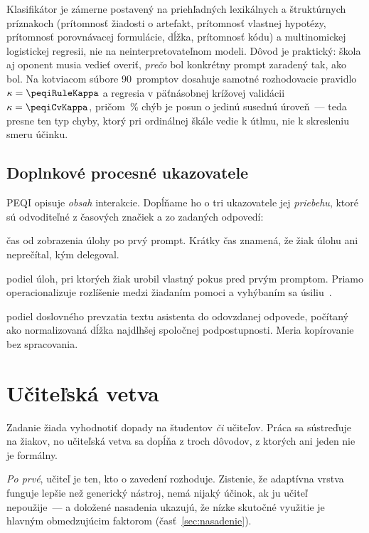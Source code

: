 Klasifikátor je zámerne postavený na priehľadných lexikálnych a štruktúrnych príznakoch (prítomnosť žiadosti o artefakt, prítomnosť vlastnej hypotézy, prítomnosť porovnávacej formulácie, dĺžka, prítomnosť kódu) a multinomickej logistickej regresii, nie na neinterpretovateľnom modeli. Dôvod je praktický: škola aj oponent musia vedieť overiť, \emph{prečo} bol konkrétny prompt zaradený tak, ako bol. Na kotviacom súbore 90~promptov dosahuje samotné rozhodovacie pravidlo $\kappa=\peqiRuleKappa$ a regresia v päťnásobnej krížovej validácii $\kappa=\peqiCvKappa$, pričom \peqiAdjacent\,\% chýb je posun o jedinú susednú úroveň~--- teda presne ten typ chyby, ktorý pri ordinálnej škále vedie k útlmu, nie k skresleniu smeru účinku.

\subsection{Doplnkové procesné ukazovatele}

PEQI opisuje \emph{obsah} interakcie. Dopĺňame ho o tri ukazovatele jej \emph{priebehu}, ktoré sú odvoditeľné z časových značiek a zo zadaných odpovedí:

\begin{description}[leftmargin=1.9cm, style=nextline, nosep]
    \item[$T_1$] čas od zobrazenia úlohy po prvý prompt. Krátky čas znamená, že žiak úlohu ani neprečítal, kým delegoval.
    \item[ABHR] podiel úloh, pri ktorých žiak urobil vlastný pokus pred prvým promptom. Priamo operacionalizuje rozlíšenie medzi žiadaním pomoci a vyhýbaním sa úsiliu~\cite{aleven2003help,baker2004gaming}.
    \item[VTR] podiel doslovného prevzatia textu asistenta do odovzdanej odpovede, počítaný ako normalizovaná dĺžka najdlhšej spoločnej podpostupnosti. Meria kopírovanie bez spracovania.
\end{description}

\section{Učiteľská vetva}
\label{sec:ucitelia}

Zadanie žiada vyhodnotiť dopady na študentov \emph{či} učiteľov. Práca sa sústreďuje na žiakov, no učiteľská vetva sa dopĺňa z troch dôvodov, z ktorých ani jeden nie je formálny.

\emph{Po prvé}, učiteľ je ten, kto o zavedení rozhoduje. Zistenie, že adaptívna vrstva funguje lepšie než generický nástroj, nemá nijaký účinok, ak ju učiteľ nepoužije~--- a doložené nasadenia ukazujú, že nízke skutočné využitie je hlavným obmedzujúcim faktorom (časť~\ref{sec:nasadenie}).

